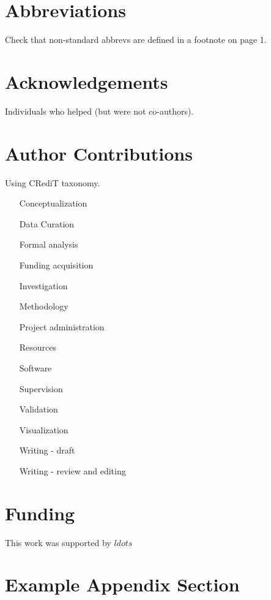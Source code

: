 \documentclass[5p]{elsarticle}
\begin{document}
\printnomenclature

\section{Abbreviations}

Check that non-standard abbrevs are defined in a footnote on page 1.

\section{Acknowledgements}

Individuals who helped (but were not co-authors).

\section{Author Contributions}
Using CRediT taxonomy.

\begin{itemize}
\item[Conceptualization]{}
\item[Data Curation]{}
\item[Formal analysis ]{}
\item[Funding acquisition]{}
\item[Investigation]{}
\item[Methodology]{}
\item[Project administration]{}
\item[Resources]{}
\item[Software]{}
\item[Supervision]{}
\item[Validation]{}
\item[Visualization]{}
\item[Writing - draft]{}
\item[Writing - review and editing]{}
\end{itemize}

\section{Funding}

This work was supported by $ldots$

\appendix
\section{Example Appendix Section}
\label{app1}
\end{document}
